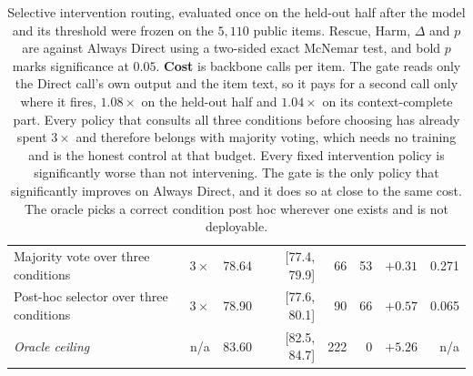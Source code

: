 \begin{table}[t]
\begin{tabular}{@{}lccrrrrr@{}}
Majority vote over three conditions & $3\times$ & 78.64 & [77.4, 79.9] & 66 & 53 & $+0.31$ & 0.271 \\
Post-hoc selector over three conditions & $3\times$ & 78.90 & [77.6, 80.1] & 90 & 66 & $+0.57$ & 0.065 \\
\textit{Oracle ceiling} & n/a & 83.60 & [82.5, 84.7] & 222 & 0 & $+5.26$ & n/a \\
\bottomrule
\end{tabular}
\caption{Selective intervention routing, evaluated once on the held-out half after the model and its threshold were frozen on the $5{,}110$ public items. Rescue, Harm, $\Delta$ and $p$ are against Always Direct using a two-sided exact McNemar test, and bold $p$ marks significance at $0.05$. \textbf{Cost} is backbone calls per item. The gate reads only the Direct call's own output and the item text, so it pays for a second call only where it fires, $1.08\times$ on the held-out half and $1.04\times$ on its context-complete part. Every policy that consults all three conditions before choosing has already spent $3\times$ and therefore belongs with majority voting, which needs no training and is the honest control at that budget. Every fixed intervention policy is significantly worse than not intervening. The gate is the only policy that significantly improves on Always Direct, and it does so at close to the same cost. The oracle picks a correct condition post hoc wherever one exists and is not deployable.}
\label{tab:router}
\end{table}
